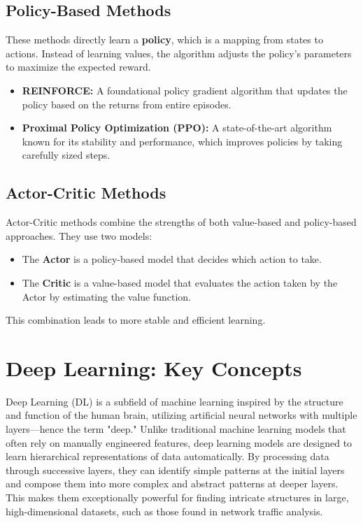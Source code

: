 \documentclass[12pt]{report}
\begin{document}
\subsection{Policy-Based Methods}
These methods directly learn a \textbf{policy}, which is a mapping from states to actions. Instead of learning values, the algorithm adjusts the policy's parameters to maximize the expected reward.
\begin{itemize}
    \item \textbf{REINFORCE:} A foundational policy gradient algorithm that updates the policy based on the returns from entire episodes.
    \item \textbf{Proximal Policy Optimization (PPO):} A state-of-the-art algorithm known for its stability and performance, which improves policies by taking carefully sized steps.
\end{itemize}

\subsection{Actor-Critic Methods}
Actor-Critic methods combine the strengths of both value-based and policy-based approaches. They use two models:
\begin{itemize}
    \item The \textbf{Actor} is a policy-based model that decides which action to take.
    \item The \textbf{Critic} is a value-based model that evaluates the action taken by the Actor by estimating the value function.
\end{itemize}
This combination leads to more stable and efficient learning.
\section{Deep Learning: Key Concepts}
Deep Learning (DL) is a subfield of machine learning inspired by the structure and function of the human brain, utilizing artificial neural networks with multiple layers—hence the term "deep." Unlike traditional machine learning models that often rely on manually engineered features, deep learning models are designed to learn hierarchical representations of data automatically. By processing data through successive layers, they can identify simple patterns at the initial layers and compose them into more complex and abstract patterns at deeper layers. This makes them exceptionally powerful for finding intricate structures in large, high-dimensional datasets, such as those found in network traffic analysis.
\end{document}
